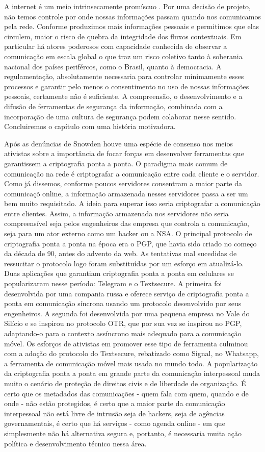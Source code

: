 A internet é um meio intrinsecamente promíscuo \cite{}.
Por uma decisão de projeto, não temos controle por onde nossas informações passam quando nos comunicamos pela rede.
Conforme produzimos mais informações pessoais e permitimos que elas circulem, maior o risco de quebra da integridade dos fluxos contextuais.
Em particular há atores poderosos com capacidade conhecida de observar a comunicação em escala global o que traz um risco coletivo tanto à soberania nacional dos países perifércos, como o Brasil, quanto à democracia.
A regulamentação, absolutamente necessaria para controlar minimamente esses processos e garantir pelo menos o consentimento no uso de nossas informações pessoais, certamente não é suficiente.
A compreensão, o desenvolvimento e a difusão de ferramentas de segurança da informação, combinada com a incorporação de uma cultura de segurança \cite{CulturaDeSeguranca} podem colaborar nesse sentido.
Concluiremos o capítulo com uma história motivadora.

Após as denúncias de Snowden houve uma espécie de consenso nos meios ativistas sobre a importância de focar forças em desenvolver ferramentas que garantissem a criptografia ponta a ponta.
O paradigma mais comum de comunicação na rede é criptografar a comunicação entre cada cliente e o servidor.
Como já dissemos, conforme poucos servidores consentram a maior parte da comunicaçõ online, a informação armazenada nesses servidores passa a ser um bem muito requisitado.
A ideia para superar isso seria criptografar a comunicação entre clientes.
Assim, a informação armazenada nos servidores não seria compreensível seja pelos engenheiros das empresa que controla a comunicação, seja para um ator externo como um hacker ou a NSA.
O principal protocolo de criptografia ponta a ponta na época era o PGP, que havia sido criado no começo da década de 90, antes do advento da web.
As tentativas mal sucedidas de ressucitar o protocolo logo foram substituídas por um esforço em atualizá-lo.
Duas aplicações que garantiam criptografia ponta a ponta em celulares se popularizaram nesse período: Telegram e o Textsecure.
A primeira foi desenvolvida por uma compania russa e oferece serviço de criptografia ponta a ponta em comunicação síncrona usando um protocolo desenvolvido por seus engenheiros.
A segunda foi desenvolvida por uma pequena empresa no Vale do Silício e se inspirou no protocolo OTR, que por sua vez se inspirou no PGP, adaptando-o para o contexto assíncrono mais adequado para a comunicação móvel.
Os esforços de ativistas em promover esse tipo de ferramenta culminou com a adoção do protocolo do Textsecure, rebatizado como Signal, no Whatsapp, a ferramenta de comunicação móvel mais usada no mundo todo.
A popularização da criptografia ponta a ponta em grande parte da comunicação interpessoal muda muito o cenário de proteção de direitos civis e de liberdade de organização.
É certo que os metadados das comunicações - quem fala com quem, quando e de onde - não estão protegidos, é certo que a maior parte da comunicação interpessoal não está livre de intrusão seja de hackers, seja de agências governamentais, é certo que há serviços - como agenda online - em que simplesmente não há alternativa segura e, portanto, é necessaria muita ação política e desenvolvimento técnico nessa área.

